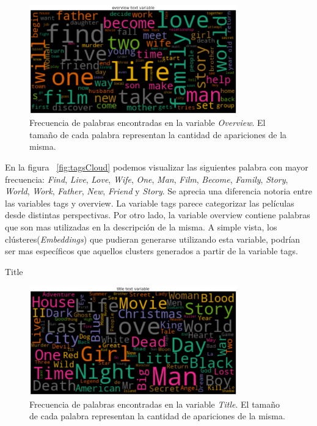 \documentclass[11pt,a4paper,twoside]{thesis}
\begin{document}
\begin{figure}[h!]
	\centering
	\includegraphics[width=9cm]{./images/Cloud-Overview.png}
	\caption{Frecuencia de palabras encontradas en la variable \textit{Overview}. El tamaño de cada palabra representan la cantidad de apariciones de la misma.}
	\label{fig:overviewCloud}
\end{figure}	


En la figura ~\ref{fig:tagsCloud} podemos visualizar las siguientes palabra con mayor frecuencia: \textit{Find}, \textit{Live}, \textit{Love}, \textit{Wife}, \textit{One}, \textit{Man}, \textit{Film}, \textit{Become}, \textit{Family}, \textit{Story}, \textit{World}, \textit{Work}, \textit{Father}, \textit{New}, \textit{Friend} y \textit{Story}. Se aprecia una diferencia notoria entre las variables tags y overview. La variable tags parece categorizar las películas desde distintas perspectivas. Por otro lado, la variable overview contiene palabras que son mas utilizadas en la descripción de la misma. A simple vista, los clústeres(\textit{Embeddings}) que pudieran generarse utilizando esta variable, podrían ser mas específicos que aquellos clusters generados a partir de la variable tags.


\begin{description}
	\item[Title]
\end{description}

\begin{figure}[h!]
	\centering
	\includegraphics[width=9cm]{./images/Cloud-Title.png}
	\caption{Frecuencia de palabras encontradas en la variable \textit{Title}. El tamaño de cada palabra representan la cantidad de apariciones de la misma.}
	\label{fig:titleCloud}
\end{figure}	
\end{document}
